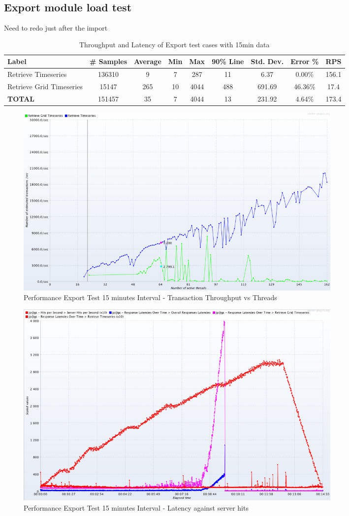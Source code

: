 \subsection{Export module load test}
Need to redo just after the import
\begin{table}[]
\begin{tabulary}{\linewidth}{|L|C|C|C|C|C|C|C|C|}
\hline
Label & \# Samples & Average & Min & Max & 90\% Line & Std. Dev. & Error \% & RPS \\ \hline
Retrieve Timeseries & 136310 & 9 & 7 & 287 & 11 & 6.37 & 0.00\% & 156.1 \\ \hline
Retrieve Grid Timeseries & 15147 & 265 & 10 & 4044 & 488 & 691.69 & 46.36\% & 17.4 \\ \hline
\textbf{TOTAL} & 151457 & 35 & 7 & 4044 & 13 & 231.92 & 4.64\% & 173.4 \\ \hline
\end{tabulary}
\caption{Throughput and Latency of Export test cases with 15min data}
\label{tab:obs_export_15_min_summary}
\end{table}

\begin{figure}[htp]
    \centering
    \includegraphics[width=0.8\textwidth]{results/obs/export/obs_export_15m_transaction_throughtput_vs_threads.png}
    \caption{Performance Export Test 15 minutes Interval - Transaction Throughput vs Threads}
    \label{fi:test_obs_export_15m_throughtput}
\end{figure}

\begin{figure}[htp]
    \centering
    \includegraphics[width=0.8\textwidth]{results/obs/export/obs_export_15m_res_latencies_against_hits.png}
    \caption{Performance Export Test 15 minutes Interval - Latency against server hits}
    \label{fi:test_obs_export_15m_latency}
\end{figure}



